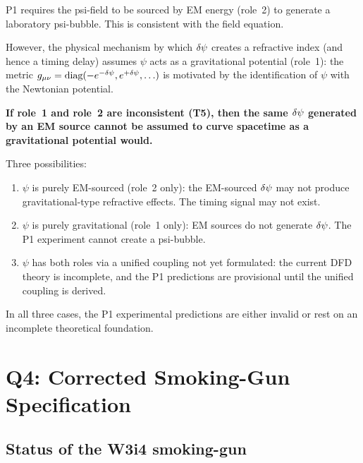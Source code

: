 \begin{theorem}
\label{thm:T5_dilemma}
P1 requires the psi-field to be sourced by EM energy (role~2) to generate
a laboratory psi-bubble. This is consistent with the field equation.

However, the physical mechanism by which $\delta\psi$ creates a refractive
index (and hence a timing delay) assumes $\psi$ acts as a gravitational
potential (role~1): the metric $g_{\mu\nu} = \text{diag}(-e^{-\delta\psi},
e^{+\delta\psi}, \ldots)$ is motivated by the identification of $\psi$ with
the Newtonian potential.

\textbf{If role~1 and role~2 are inconsistent (T5), then the same $\delta\psi$
generated by an EM source cannot be assumed to curve spacetime as a
gravitational potential would.}

Three possibilities:
\begin{enumerate}[nosep]
\item[(a)] $\psi$ is purely EM-sourced (role~2 only): the EM-sourced $\delta\psi$
  may not produce gravitational-type refractive effects. The timing signal
  may not exist.
\item[(b)] $\psi$ is purely gravitational (role~1 only): EM sources do not
  generate $\delta\psi$. The P1 experiment cannot create a psi-bubble.
\item[(c)] $\psi$ has both roles via a unified coupling not yet formulated:
  the current DFD theory is incomplete, and the P1 predictions are
  provisional until the unified coupling is derived.
\end{enumerate}

In all three cases, the P1 experimental predictions are either invalid
or rest on an incomplete theoretical foundation.
\end{theorem}

\section{Q4: Corrected Smoking-Gun Specification}
\label{sec:corrected_smoking_gun}

\subsection{Status of the W3i4 smoking-gun}
\label{ssec:smoking_gun_status}

